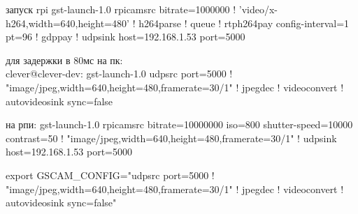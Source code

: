 запуск rpi
gst-launch-1.0 rpicamsrc bitrate=1000000 ! 'video/x-h264,width=640,height=480' ! h264parse ! queue ! rtph264pay config-interval=1 pt=96 ! gdppay ! udpsink host=192.168.1.53 port=5000

для задержки в 80мс на пк:\\
clever@clever-dev: gst-launch-1.0 udpsrc port=5000 ! "image/jpeg,width=640,height=480,framerate=30/1" ! jpegdec ! videoconvert ! autovideosink sync=false

на рпи:
gst-launch-1.0 rpicamsrc bitrate=10000000 iso=800 shutter-speed=10000 contrast=50 ! "image/jpeg,width=640,height=480,framerate=30/1" ! udpsink host=192.168.1.53 port=5000

export GSCAM_CONFIG="udpsrc port=5000 ! "image/jpeg,width=640,height=480,framerate=30/1" ! jpegdec ! videoconvert ! autovideosink sync=false"

